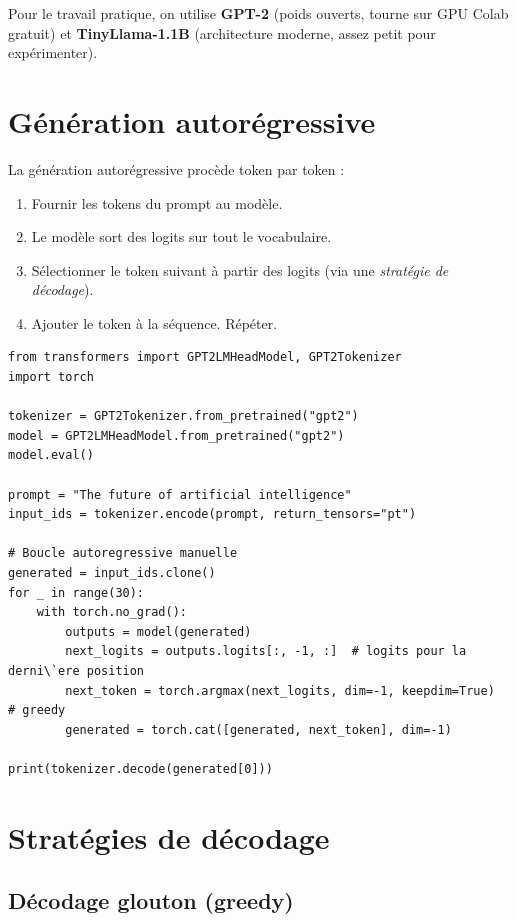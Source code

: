 Pour le travail pratique, on utilise \textbf{GPT-2} (poids ouverts, tourne sur GPU Colab gratuit) et \textbf{TinyLlama-1.1B} (architecture moderne, assez petit pour exp\'erimenter).

\section{G\'en\'eration autor\'egressive}

La g\'en\'eration autor\'egressive proc\`ede token par token :
\begin{enumerate}
  \item Fournir les tokens du prompt au mod\`ele.
  \item Le mod\`ele sort des logits sur tout le vocabulaire.
  \item S\'electionner le token suivant \`a partir des logits (via une \emph{strat\'egie de d\'ecodage}).
  \item Ajouter le token \`a la s\'equence. R\'ep\'eter.
\end{enumerate}

\begin{verbatim}
from transformers import GPT2LMHeadModel, GPT2Tokenizer
import torch

tokenizer = GPT2Tokenizer.from_pretrained("gpt2")
model = GPT2LMHeadModel.from_pretrained("gpt2")
model.eval()

prompt = "The future of artificial intelligence"
input_ids = tokenizer.encode(prompt, return_tensors="pt")

# Boucle autoregressive manuelle
generated = input_ids.clone()
for _ in range(30):
    with torch.no_grad():
        outputs = model(generated)
        next_logits = outputs.logits[:, -1, :]  # logits pour la derni\`ere position
        next_token = torch.argmax(next_logits, dim=-1, keepdim=True)  # greedy
        generated = torch.cat([generated, next_token], dim=-1)

print(tokenizer.decode(generated[0]))
\end{verbatim}

\section{Strat\'egies de d\'ecodage}

\subsection{D\'ecodage glouton (greedy)}

